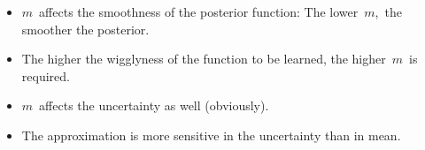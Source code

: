 \documentclass[8pt]{beamer} %
\begin{document}
\begin{frame}
\begin{enumerate}
\begin{itemize}
\begin{adjustwidth}{-4.7em}{-3em}
\end{adjustwidth}

\normalsize 
\item<3-> $m$\, affects the smoothness of the posterior function:\; The lower\, $m$,\, the smoother the posterior.
\item<3-> The higher the wigglyness of the function to be learned, the higher\, $m$\, is required.
\item<4-> $m$\, affects the uncertainty as well (obviously).
\item<4-> The approximation is more sensitive in the uncertainty than in mean.
\end{itemize}
\end{enumerate}
\end{frame}
\end{document}
